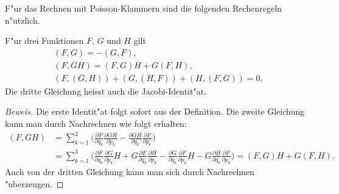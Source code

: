F"ur das Rechnen mit Poisson-Klammern sind die folgenden Rechenregeln
n"utzlich.
\begin{satz}
F"ur drei Funktionen $F$, $G$ und $H$ gilt
\begin{gather}
(F,G)=-(G,F),
\label{skript:poisson-antisymmetrie}
\\
(F,GH)
=
(F,G)H+G(F,H),
\label{skript:poisson-derivation}
\\
(F,(G,H))
+
(G,(H,F))
+
(H,(F,G))
=0.
\label{skript:poisson-jacobi}
\end{gather}
Die dritte Gleichung heisst auch die Jacobi-Identit"at.
\end{satz}

\begin{proof}[Beweis]
Die erste Identit"at folgt sofort aus der Definition.
Die zweite Gleichung kann man durch Nachrechnen wie folgt erhalten:
\begin{align*}
(F,GH)
&=
\sum_{k=1}^3 \biggl(
\frac{\partial F}{\partial q_k}\frac{\partial GH}{\partial p_k}
-
\frac{\partial GH}{\partial q_k}\frac{\partial F}{\partial p_k}
\biggr)
\\
&=
\sum_{k=1}^3 \biggl(
\frac{\partial F}{\partial q_k}\frac{\partial G}{\partial p_k}H
+
G\frac{\partial F}{\partial q_k}\frac{\partial H}{\partial p_k}
-
\frac{\partial G}{\partial q_k}\frac{\partial F}{\partial p_k}H
-
G\frac{\partial H}{\partial q_k}\frac{\partial F}{\partial p_k}
\biggr)
=(F,G)H + G(F,H).
\end{align*}
Auch von der dritten Gleichung kann man sich durch Nachrechnen
"uberzeugen.
\end{proof}

